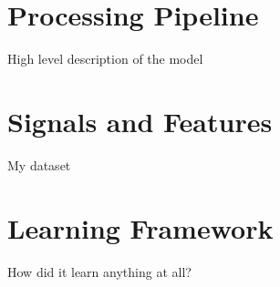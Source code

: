 
\section{Processing Pipeline}
\label{sec:processing_architecture}

High level description of the model

\section{Signals and Features}
\label{sec:model}

My dataset

\section{Learning Framework}
\label{sec:learning_framework}

How did it learn anything at all?
